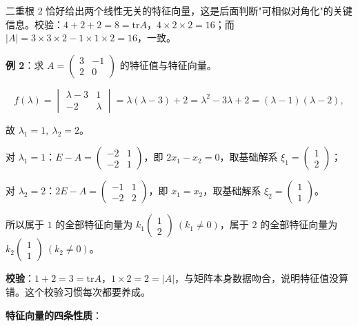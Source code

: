 \documentclass[11pt,openany,UTF8]{ctexbook}
\begin{document}
二重根 $2$ 恰好给出两个线性无关的特征向量，这是后面判断"可相似对角化"的关键信息。校验：$4+2+2=8=\mathrm{tr}A$，$4\times2\times2=16$；而 $\vert A\vert=3\times3\times2-1\times1\times2=16$，一致。

\textbf{例 2}：求 $A=\begin{pmatrix}3&-1\\2&0\end{pmatrix}$ 的特征值与特征向量。

\[f(\lambda)=\begin{vmatrix}\lambda-3&1\\-2&\lambda\end{vmatrix}=\lambda(\lambda-3)+2=\lambda^2-3\lambda+2=(\lambda-1)(\lambda-2),\]

故 $\lambda_1=1,\ \lambda_2=2$。

对 $\lambda_1=1$：$E-A=\begin{pmatrix}-2&1\\-2&1\end{pmatrix}$，即 $2x_1-x_2=0$，取基础解系 $\xi_1=\begin{pmatrix}1\\2\end{pmatrix}$；

对 $\lambda_2=2$：$2E-A=\begin{pmatrix}-1&1\\-2&2\end{pmatrix}$，即 $x_1=x_2$，取基础解系 $\xi_2=\begin{pmatrix}1\\1\end{pmatrix}$。

所以属于 $1$ 的全部特征向量为 $k_1\begin{pmatrix}1\\2\end{pmatrix}\ (k_1\neq0)$，属于 $2$ 的全部特征向量为 $k_2\begin{pmatrix}1\\1\end{pmatrix}\ (k_2\neq0)$。

\textbf{校验}：$1+2=3=\mathrm{tr}A$，$1\times2=2=\vert A\vert$，与矩阵本身数据吻合，说明特征值没算错。这个校验习惯每次都要养成。

\textbf{特征向量的四条性质}：
\end{document}
